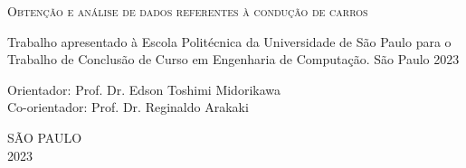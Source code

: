 \begin{titlepage}
\vfill
\begin{center}
    \vspace{2cm}
    {\Large \textsc{Obtenção e análise de dados referentes à condução de carros}\\}
    \vspace{1cm}
    \hspace{.45\linewidth}
    \begin{minipage}{.50\linewidth}

            Trabalho apresentado à Escola Politécnica da Universidade de São Paulo para
            o Trabalho de Conclusão de Curso em Engenharia de Computação.
            São Paulo
            2023

            \vspace{0.5 cm}

            Orientador:     Prof. Dr. Edson Toshimi Midorikawa\\
            Co-orientador: Prof. Dr. Reginaldo Arakaki\\
    
    \end{minipage}

    \vspace{2cm}
    \vfill
    {\large SÃO PAULO\\ 2023}
\end{center}

\end{titlepage}